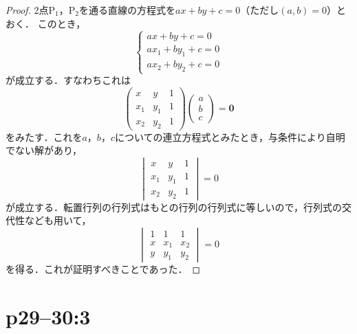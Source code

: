 \documentclass[a4paper,10pt,fleqn]{ltjsarticle}
\begin{document}
\begin{tleftbar}
  \begin{proof}
    2点$\mathrm{P}_1$，$\mathrm{P_2}$を通る直線の方程式を$ax+by+c=0$（ただし$(a,b)=0$）とおく．
    このとき，
    \[
      \begin{cases}
        ax+by+c =0       \\
        ax_1 + by_1 +c=0 \\
        ax_2 + by_2 +c =0
      \end{cases}
    \]
    が成立する．すなわちこれは
    \[
      \begin{pmatrix}
        x   & y   & 1 \\
        x_1 & y_1 & 1 \\
        x_2 & y_2 & 1
      \end{pmatrix}
      \begin{pmatrix}
        a \\
        b \\
        c
      \end{pmatrix}
      = \bm{0}
    \]
    をみたす．これを$a$，$b$，$c$についての連立方程式とみたとき，与条件により自明でない解があり，
    \[
      \begin{vmatrix}
        x   & y   & 1 \\
        x_1 & y_1 & 1 \\
        x_2 & y_2 & 1
      \end{vmatrix}
      =0
    \]
    が成立する．転置行列の行列式はもとの行列の行列式に等しいので，行列式の交代性なども用いて，
    \[
      \begin{vmatrix}
        1 & 1   & 1   \\
        x & x_1 & x_2 \\
        y & y_1 & y_2
      \end{vmatrix}
      =0
    \]
    を得る．これが証明すべきことであった．
  \end{proof}
\end{tleftbar}



\section*{p29--30:3}
\end{document}
